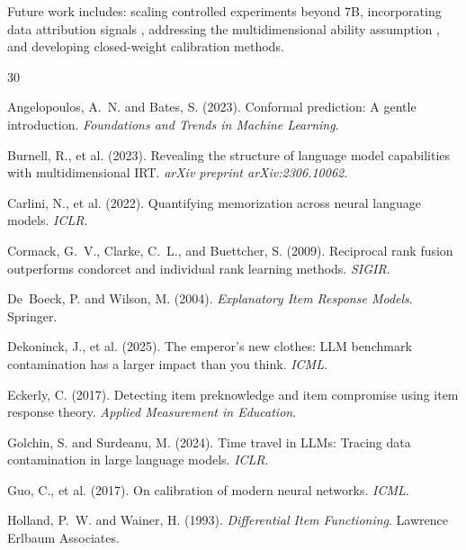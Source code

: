\documentclass[11pt,a4paper]{article}
\begin{document}
Future work includes: scaling controlled experiments beyond 7B, incorporating data attribution signals \cite{pruthi2020estimating,park2023trak}, addressing the multidimensional ability assumption \cite{reckase2009multidimensional}, and developing closed-weight calibration methods.


\begin{thebibliography}{30}

Angelopoulos, A.~N. and Bates, S. (2023).
Conformal prediction: A gentle introduction.
{\em Foundations and Trends in Machine Learning}.

Burnell, R., et al. (2023).
Revealing the structure of language model capabilities with multidimensional IRT.
{\em arXiv preprint arXiv:2306.10062}.

Carlini, N., et al. (2022).
Quantifying memorization across neural language models.
{\em ICLR}.

Cormack, G.~V., Clarke, C.~L., and Buettcher, S. (2009).
Reciprocal rank fusion outperforms condorcet and individual rank learning methods.
{\em SIGIR}.

De~Boeck, P. and Wilson, M. (2004).
{\em Explanatory Item Response Models}.
Springer.

Dekoninck, J., et al. (2025).
The emperor's new clothes: LLM benchmark contamination has a larger impact than you think.
{\em ICML}.

Eckerly, C. (2017).
Detecting item preknowledge and item compromise using item response theory.
{\em Applied Measurement in Education}.

Golchin, S. and Surdeanu, M. (2024).
Time travel in LLMs: Tracing data contamination in large language models.
{\em ICLR}.

Guo, C., et al. (2017).
On calibration of modern neural networks.
{\em ICML}.

Holland, P.~W. and Wainer, H. (1993).
{\em Differential Item Functioning}.
Lawrence Erlbaum Associates.


\end{thebibliography}
\end{document}
